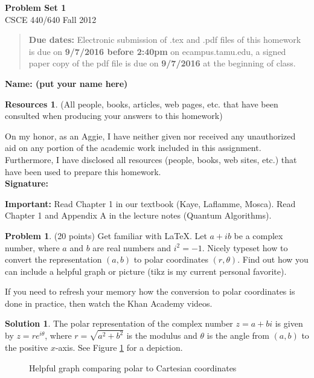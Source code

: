 \documentclass{article}
\theoremstyle{definition}
\newtheorem{problem}{Problem}
\newtheorem*{solution}{Solution}
\newtheorem*{resources}{Resources}
\newcommand{\name}[1]{\noindent\textbf{Name: #1}}
\newcommand{\honor}{\noindent On my honor, as an Aggie, I have neither
  given nor received any unauthorized aid on any portion of the
  academic work included in this assignment. Furthermore, I have
  disclosed all resources (people, books, web sites, etc.) that have
  been used to prepare this homework. \\[1ex]
 \textbf{Signature:} \underline{\hspace*{5cm}} }
\newcommand{\problemset}[1]{\begin{center}\textbf{Problem Set #1}\\ 
CSCE 440/640 Fall 2012\end{center}}
\newcommand{\duedate}[2]{\begin{quote}\textbf{Due dates:} Electronic submission of .tex
    and .pdf files of this homework is due on \textbf{#1} on ecampus.tamu.edu, a signed paper copy
    of the pdf file is due on \textbf{#2} at the beginning of
    class. \end{quote} }
\begin{document}
\problemset{1}
\duedate{9/7/2016 before 2:40pm}{9/7/2016}
\name{ (put your name here)}
\begin{resources} (All people, books, articles, web pages, etc. that
  have been consulted when producing your answers to this homework)
\end{resources}
\honor

\newpage

\textbf{Important: } 
Read Chapter 1 in our textbook (Kaye, Laflamme, Mosca). Read Chapter 1
and Appendix A in the lecture notes (Quantum Algorithms). 

\begin{problem} (20 points) Get familiar with \LaTeX. Let $a+ib$ be a
  complex number, where $a$ and $b$ are real numbers and
  $i^2=-1$. Nicely typeset how to convert the representation $(a,b)$
  to polar coordinates $(r,\theta)$. Find out how you can include a
  helpful graph or picture (tikz is my current personal favorite). 

  If you need to refresh your memory how the conversion to polar
  coordinates is done in practice, then watch the Khan Academy
  videos. 
\end{problem}
\begin{solution}
The polar representation of the complex number $z = a + bi$ is given by
$z = r e^{i \theta}$, where $r = \sqrt{a^2 + b^2}$ is the modulus and
$\theta$ is the angle from $(a,b)$ to the positive $x$-axis.  See Figure \ref{fig:help}
for a depiction.
\begin{figure}
\centering
{}
\caption{Helpful graph comparing polar to Cartesian coordinates}
\label{fig:help}
\end{figure}

\end{solution}
\end{document}
